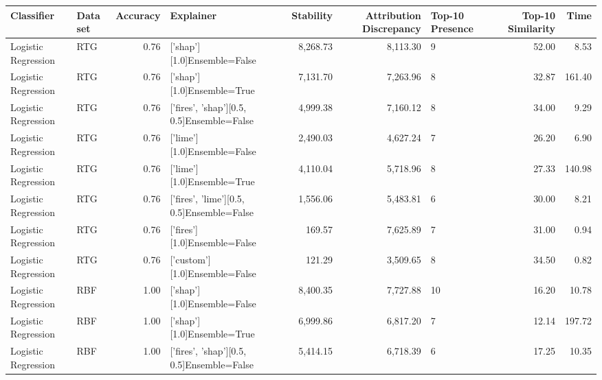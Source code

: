\begin{tabular}{llrlrrlrr}
\toprule
         Classifier &       Data set &  Accuracy &                                 Explainer &  Stability &  Attribution Discrepancy & Top-10 Presence &  Top-10 Similarity &   Time \\
\midrule
Logistic Regression &            RTG &      0.76 &               ['shap'][1.0]Ensemble=False &   8,268.73 &                 8,113.30 &               9 &              52.00 &   8.53 \\
Logistic Regression &            RTG &      0.76 &                ['shap'][1.0]Ensemble=True &   7,131.70 &                 7,263.96 &               8 &              32.87 & 161.40 \\
Logistic Regression &            RTG &      0.76 & ['fires', 'shap'][0.5, 0.5]Ensemble=False &   4,999.38 &                 7,160.12 &               8 &              34.00 &   9.29 \\
Logistic Regression &            RTG &      0.76 &               ['lime'][1.0]Ensemble=False &   2,490.03 &                 4,627.24 &               7 &              26.20 &   6.90 \\
Logistic Regression &            RTG &      0.76 &                ['lime'][1.0]Ensemble=True &   4,110.04 &                 5,718.96 &               8 &              27.33 & 140.98 \\
Logistic Regression &            RTG &      0.76 & ['fires', 'lime'][0.5, 0.5]Ensemble=False &   1,556.06 &                 5,483.81 &               6 &              30.00 &   8.21 \\
Logistic Regression &            RTG &      0.76 &              ['fires'][1.0]Ensemble=False &     169.57 &                 7,625.89 &               7 &              31.00 &   0.94 \\
Logistic Regression &            RTG &      0.76 &             ['custom'][1.0]Ensemble=False &     121.29 &                 3,509.65 &               8 &              34.50 &   0.82 \\
Logistic Regression &            RBF &      1.00 &               ['shap'][1.0]Ensemble=False &   8,400.35 &                 7,727.88 &              10 &              16.20 &  10.78 \\
Logistic Regression &            RBF &      1.00 &                ['shap'][1.0]Ensemble=True &   6,999.86 &                 6,817.20 &               7 &              12.14 & 197.72 \\
Logistic Regression &            RBF &      1.00 & ['fires', 'shap'][0.5, 0.5]Ensemble=False &   5,414.15 &                 6,718.39 &               6 &              17.25 &  10.35 \\

\end{tabular}
